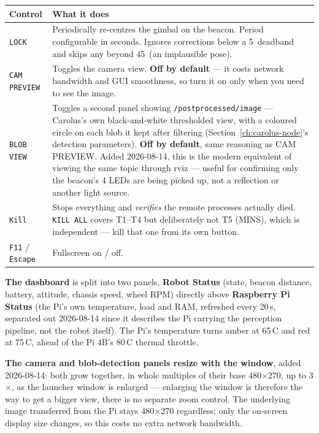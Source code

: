 \documentclass[11pt]{report}
\begin{document}
\begin{center}
\begin{tabular}{p{}p{}}
\toprule
Control & What it does \\
\midrule
\texttt{LOCK} & Periodically re-centres the gimbal on the beacon. Period
  configurable in seconds. Ignores corrections below a 5\,\textdegree{}
  deadband and skips any beyond 45\,\textdegree{} (an implausible pose). \\
\addlinespace
\texttt{CAM PREVIEW} & Toggles the camera view. \textbf{Off by default} ---
  it costs network bandwidth and GUI smoothness, so turn it on only when you
  need to see the image. \\
\addlinespace
\texttt{BLOB VIEW} & Toggles a second panel showing \texttt{/postprocessed/image}
  --- Carolus's own black-and-white thresholded view, with a coloured circle on
  each blob it kept after filtering (Section~\ref{ch:carolus-node}'s detection
  parameters). \textbf{Off by default}, same reasoning as CAM PREVIEW. Added
  2026-08-14, this is the modern equivalent of viewing the same topic through
  rviz --- useful for confirming only the beacon's 4 LEDs are being picked up,
  not a reflection or another light source. \\
\addlinespace
\texttt{Kill} & Stops everything and \emph{verifies} the remote processes
  actually died. \texttt{KILL ALL} covers T1--T4 but deliberately not T5
  (MINS), which is independent --- kill that one from its own button. \\
\addlinespace
\texttt{F11} / \texttt{Escape} & Fullscreen on / off. \\
\bottomrule
\end{tabular}
\end{center}

\textbf{The dashboard} is split into two panels, \textbf{Robot Status}
(state, beacon distance, battery, attitude, chassis speed, wheel RPM)
directly above
\textbf{Raspberry Pi Status} (the Pi's own temperature, load and RAM,
refreshed every 20\,s, separated out 2026-08-14 since it describes the Pi
carrying the perception pipeline, not the robot itself). The Pi's
temperature turns amber at 65\,\textdegree C and red at 75\,\textdegree C,
ahead of the Pi 4B's 80\,\textdegree C thermal throttle.

\textbf{The camera and blob-detection panels resize with the window},
added 2026-08-14: both grow together, in whole multiples of their base
480$\times$270, up to 3$\times$, as the launcher window is enlarged ---
enlarging the window is therefore the way to get a bigger view, there is no
separate zoom control. The underlying image transferred from the Pi stays
480$\times$270 regardless; only the on-screen display size changes, so this
costs no extra network bandwidth.
\end{document}
